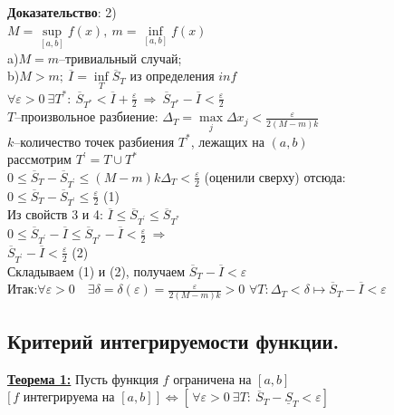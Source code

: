\documentclass[a4paper,12pt]{article} %
\begin{document}
\textbf{Доказательство}: 2)\\
$M=\sup\limits_{[a,b]}{f(x)},~m=\inf\limits_{[a,b]}{f(x)}$\\
a)$M=m$--тривиальный случай;\\
b)$M>m;~\overline{I}=\inf\limits_{T}{\overline{S}_T}$ из определения $inf$\\
$\forall \varepsilon>0~\exists T^{*}:~\overline{S}_{T^{*}}<\overline{I}+\frac{\varepsilon}{2}~\Rightarrow~\overline{S}_{T^{*}}-\overline{I}<\frac{\varepsilon}{2}$\\
$T$--произвольное разбиение: $\Delta_T=\max\limits_{j}{\Delta x_j}<\frac{\varepsilon}{2(M-m)k}$\\
$k$--количество точек разбиения $T^{*}$, лежащих на $(a,b)$\\
рассмотрим $T^{\prime}=T\cup T^{*}$\\
$0\leq \overline{S}_T-\overline{S}_{T^{\prime}}\leq (M-m)k\Delta_T<\frac{\varepsilon}{2}$ (оценили сверху) отсюда:\\
$0\leq \overline{S}_T-\overline{S}_{T^{\prime}}\leq \frac{\varepsilon}{2}$ (1)\\
Из свойств 3 и 4: $\overline{I}\leq \overline{S}_{T^{\prime}}\leq  \overline{S}_{T^{*}}$\\
$0\leq  \overline{S}_{T^{\prime}}-\overline{I}\leq \overline{S}_{T^{*}}-\overline{I}<\frac{\varepsilon}{2}~\Rightarrow$\\
$\overline{S}_{T^{\prime}}-\overline{I}<\frac{\varepsilon}{2}$ (2)\\
Складываем (1) и (2), получаем $ \overline{S}_T-\overline{I}<\varepsilon$\\
Итак:$\forall \varepsilon>0 \quad \exists \delta=\delta(\varepsilon)=\frac{\varepsilon}{2(M-m) k}>0$
$\forall T: \Delta_{T}<\delta \longmapsto\overline{S}_T-\overline{I}<\varepsilon$\\

\subsection{Критерий интегрируемости функции.}


\underline{\textbf{Теорема 1:}} Пусть функция $f$ ограничена на $[a,b]$\\
$[\,f$ интегрируема на $[a,b]~]\, \Leftrightarrow [\,\forall\varepsilon>0~\exists T:~\overline{S}_T-\underline{S}_T<\varepsilon]\,$\\
\end{document}
